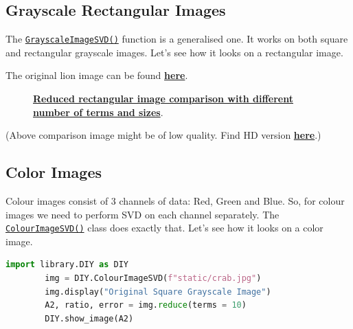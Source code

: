 	\subsection{Grayscale Rectangular Images}
		The \href{https://github.com/PeithonKing/comp_phys_P346/blob/main/library/DIY.py#L62-L84}{\texttt{GrayscaleImageSVD()}}  function is a generalised one. It works on both square and rectangular grayscale images. Let's see how it looks on a rectangular image.

		The original lion image can be found \href{https://github.com/PeithonKing/comp_phys_P346/blob/main/static/lion.jpg}{\textbf{here}}.

		\begin{figure}[H]
			\centering
			\caption{\href{https://github.com/PeithonKing/comp_phys_P346/blob/main/static/lion_evolution.png}{\textbf{Reduced rectangular image comparison with different number of terms and sizes}}.}
			\label{fig:g_lion_evol}
		\end{figure}

		(Above comparison image might be of low quality. Find HD version \href{https://github.com/PeithonKing/comp_phys_P346/blob/main/static/lion_evolution.png}{\textbf{here}}.)

	\subsection{Color Images}

		Colour images consist of 3 channels of data: Red, Green and Blue. So, for colour images we need to perform SVD on each channel separately. The \href{https://github.com/PeithonKing/comp_phys_P346/blob/main/library/DIY.py#L86-L133}{\texttt{ColourImageSVD()}} class does exactly that. Let's see how it looks on a color image.

		\begin{lstlisting}[language=Python, caption={Working with colour images}, label={lst:c_crab_10}]
		import library.DIY as DIY
		img = DIY.ColourImageSVD(f"static/crab.jpg")
		img.display("Original Square Grayscale Image")
		A2, ratio, error = img.reduce(terms = 10)
		DIY.show_image(A2)\end{lstlisting}

